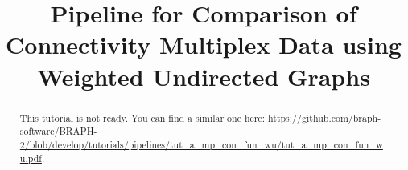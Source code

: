 \documentclass[justified]{tufte-handout}
\title[Comparison of Connectivity Multiplex Data using WU]{Pipeline for Comparison of Connectivity Multiplex Data using Weighted Undirected Graphs}
\begin{document}
\maketitle

\begin{abstract}
\noindent
This tutorial is not ready. You can find a similar one here: \url{https://github.com/braph-software/BRAPH-2/blob/develop/tutorials/pipelines/tut_a_mp_con_fun_wu/tut_a_mp_con_fun_wu.pdf}.
\end{abstract}
\end{document}
